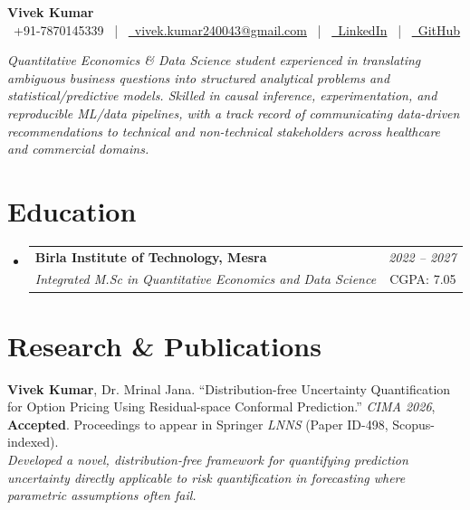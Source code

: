 \documentclass[a4paper,10pt]{article}
\makeatletter
\newcommand{\resumeSubheading}[4]{\vspace{0.5mm}\item
    \begin{tabular*}{0.98\textwidth}[t]{l@{\extracolsep{\fill}}r}
        \textbf{#1} & \textit{\footnotesize{#4}} \\
        \textit{\footnotesize{#3}} &  \footnotesize{#2}
    \end{tabular*}
}
\newcommand{\resumeSubHeadingListStart}{\begin{itemize}[leftmargin=*,labelsep=0mm]}
\newcommand{\resumeSubHeadingListEnd}{\end{itemize}\vspace{1mm}}
\makeatother
\begin{document}
\selectfont

\begin{center}
    {\Huge \textbf{Vivek Kumar}} \\ \vspace{2mm}
    \faPhone\ +91-7870145339 ~|~
    \href{mailto:vivek.kumar240043@gmail.com}{\faEnvelope\ vivek.kumar240043@gmail.com} ~|~
    \href{https://in.linkedin.com/in/vivek-kumar-3556412a0}{\faLinkedin\ LinkedIn} ~|~
    \href{https://github.com/KalWardin-Dronzer}{\faGithub\ GitHub}
\end{center}

\vspace{-2mm}
\begin{center}
\small \textit{Quantitative Economics \& Data Science student experienced in translating ambiguous business questions into structured analytical problems and statistical/predictive models. Skilled in causal inference, experimentation, and reproducible ML/data pipelines, with a track record of communicating data-driven recommendations to technical and non-technical stakeholders across healthcare and commercial domains.}
\end{center}

\section{Education}
\resumeSubHeadingListStart
    \resumeSubheading
      {Birla Institute of Technology, Mesra}{CGPA: 7.05}
      {Integrated M.Sc in Quantitative Economics and Data Science}{2022 -- 2027}
\resumeSubHeadingListEnd

\section{Research \& Publications}
\begin{itemize}[leftmargin=3ex, labelsep=1.2mm, itemsep=0mm]
    \small{\item \textbf{Vivek Kumar}, Dr. Mrinal Jana. ``Distribution-free Uncertainty Quantification for Option Pricing Using Residual-space Conformal Prediction.'' \textit{CIMA 2026}, \textbf{Accepted}. Proceedings to appear in Springer \textit{LNNS} (Paper ID-498, Scopus-indexed).
    \\ \vspace{1mm}
    \textit{Developed a novel, distribution-free framework for quantifying prediction uncertainty directly applicable to risk quantification in forecasting where parametric assumptions often fail.}}
\end{itemize}
\end{document}
